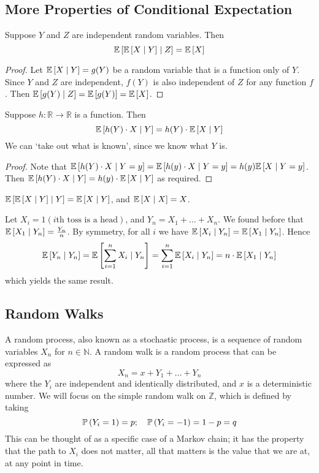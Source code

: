 \subsection{More Properties of Conditional Expectation}
\begin{proposition}
	Suppose \(Y\) and \(Z\) are independent random variables. Then
	\[ \mathbb{E}\left[{\mathbb{E}\left[{X \mid Y}\right] \mid Z}\right] = \mathbb{E}\left[{X}\right] \]
\end{proposition}
\begin{proof}
	Let \(\mathbb{E}\left[{X \mid Y}\right] = g(Y)\) be a random variable that is a function only of \(Y\). Since \(Y\) and \(Z\) are independent, \(f(Y)\) is also independent of \(Z\) for any function \(f\). Then \(\mathbb{E}\left[{g(Y) \mid Z}\right] = \mathbb{E}\left[{g(Y)}\right] = \mathbb{E}\left[{X}\right]\).
\end{proof}
\begin{proposition}
	Suppose \(h \colon \mathbb R \to \mathbb R\) is a function. Then
	\[ \mathbb{E}\left[{h(Y) \cdot X \mid Y}\right] = h(Y) \cdot \mathbb{E}\left[{X \mid Y}\right] \]
	We can `take out what is known', since we know what \(Y\) is.
\end{proposition}
\begin{proof}
	Note that \(\mathbb{E}\left[{h(Y) \cdot X \mid Y = y}\right] = \mathbb{E}\left[{h(y) \cdot X \mid Y = y}\right] = h(y) \mathbb{E}\left[{X \mid Y = y}\right]\). Then \(\mathbb{E}\left[{h(Y) \cdot X \mid Y}\right] = h(y) \cdot \mathbb{E}\left[{X \mid Y}\right]\) as required.
\end{proof}
\begin{corollary}
	\(\mathbb{E}\left[{\mathbb{E}\left[{X \mid Y}\right] \mid Y}\right] = \mathbb{E}\left[{X \mid Y}\right]\), and \(\mathbb{E}\left[{X \mid X}\right] = X\).
\end{corollary}
\noindent Let \(X_i = 1(i\text{th toss is a head})\), and \(Y_n = X_1 + \dots + X_n\). We found before that \(\mathbb{E}\left[{X_1 \mid Y_n}\right] = \frac{Y_n}{n}\). By symmetry, for all \(i\) we have \(\mathbb{E}\left[{X_i \mid Y_n}\right] = \mathbb{E}\left[{X_1 \mid Y_n}\right]\). Hence
\[ \mathbb{E}\left[{Y_n \mid Y_n}\right] = \mathbb{E}\left[{\sum_{i=1}^n X_i \mid Y_n}\right] = \sum_{i=1}^n \mathbb{E}\left[{X_i \mid Y_n}\right] = n \cdot \mathbb{E}\left[{X_1 \mid Y_n}\right] \]
which yields the same result.

\subsection{Random Walks}
A random process, also known as a stochastic process, is a sequence of random variables \(X_n\) for \(n \in \mathbb N\). A random walk is a random process that can be expressed as
\[ X_n = x + Y_1 + \dots + Y_n \]
where the \(Y_i\) are independent and identically distributed, and \(x\) is a deterministic number. We will focus on the simple random walk on \(\mathbb Z\), which is defined by taking
\[ \mathbb{P}\left({Y_i = 1}\right) = p;\quad \mathbb{P}\left({Y_i = -1}\right) = 1-p = q \]
This can be thought of as a specific case of a Markov chain; it has the property that the path to \(X_i\) does not matter, all that matters is the value that we are at, at any point in time.

